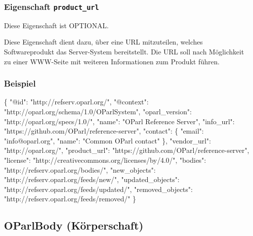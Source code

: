 \documentclass[,a4paper]{article}
\newenvironment{Shaded}{}{}
\newcommand{\DataTypeTok}[1]{\textcolor[rgb]{0.56,0.13,0.00}{{#1}}}
\newcommand{\StringTok}[1]{\textcolor[rgb]{0.25,0.44,0.63}{{#1}}}
\newcommand{\NormalTok}[1]{{#1}}
\begin{document}
\subsubsection{Eigenschaft \texttt{product\_url}}

Diese Eigenschaft ist OPTIONAL.

Diese Eigenschaft dient dazu, über eine URL mitzuteilen, welches
Softwareprodukt das Server-System bereitstellt. Die URL soll nach
Möglichkeit zu einer WWW-Seite mit weiteren Informationen zum Produkt
führen.

\subsubsection{Beispiel}

\begin{Shaded}
\begin{Highlighting}[]
\NormalTok{\{}
    \DataTypeTok{"@id"}\NormalTok{: }\StringTok{"http://refserv.oparl.org/"}\NormalTok{,}
    \DataTypeTok{"@context"}\NormalTok{: }\StringTok{"http://oparl.org/schema/1.0/OParlSystem"}\NormalTok{,}
    \DataTypeTok{"oparl_version"}\NormalTok{: }\StringTok{"http://oparl.org/specs/1.0/"}\NormalTok{,}
    \DataTypeTok{"name"}\NormalTok{: }\StringTok{"OParl Reference Server"}\NormalTok{,}
    \DataTypeTok{"info_url"}\NormalTok{: }\StringTok{"https://github.com/OParl/reference-server"}\NormalTok{,}
    \DataTypeTok{"contact"}\NormalTok{: \{}
        \DataTypeTok{"email"}\NormalTok{: }\StringTok{"info@oparl.org"}\NormalTok{,}
        \DataTypeTok{"name"}\NormalTok{: }\StringTok{"Common OParl contact"}
    \NormalTok{\}, }
    \DataTypeTok{"vendor_url"}\NormalTok{: }\StringTok{"http://oparl.org/"}\NormalTok{,}
    \DataTypeTok{"product_url"}\NormalTok{: }\StringTok{"https://github.com/OParl/reference-server"}\NormalTok{,}
    \DataTypeTok{"license"}\NormalTok{: }\StringTok{"http://creativecommons.org/licenses/by/4.0/"}\NormalTok{,}
    \DataTypeTok{"bodies"}\NormalTok{: }\StringTok{"http://refserv.oparl.org/bodies/"}\NormalTok{,}
    \DataTypeTok{"new_objects"}\NormalTok{: }\StringTok{"http://refserv.oparl.org/feeds/new/"}\NormalTok{,}
    \DataTypeTok{"updated_objects"}\NormalTok{: }\StringTok{"http://refserv.oparl.org/feeds/updated/"}\NormalTok{,}
    \DataTypeTok{"removed_objects"}\NormalTok{: }\StringTok{"http://refserv.oparl.org/feeds/removed/"}
\NormalTok{\}}
\end{Highlighting}
\end{Shaded}

\subsection{OParlBody (Körperschaft)}
\end{document}

